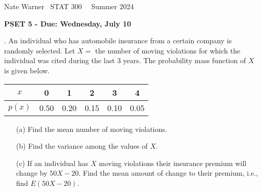 \documentclass{report}
\title{\Huge{}}
\author{\huge{Nathan Warner}}
\date{\huge{}}
\begin{document}
 \pagebreak \bigbreak \noindent
 Nate Warner \ \quad \quad \quad \quad \quad \quad \quad \quad \quad \quad \quad \quad  STAT 300 \quad  \quad \quad \quad \quad \quad \quad \quad \quad \ \ \quad Summer 2024
 \begin{center}
     \textbf{PSET 5 - Due: Wednesday, July 10}
 \end{center}
 \bigbreak \noindent 
 \begin{mdframed}
     . An individual who has automobile insurance from a certain company is randomly selected. Let \( X = \) the number of moving violations for which the individual was cited during the last 3 years. The probability mass function of \( X \) is given below.

     \begin{center}
         \begin{tabular}{|c|c|c|c|c|c|}
             \hline
             \( x \) & 0 & 1 & 2 & 3 & 4 \\
             \hline
             \( p(x) \) & 0.50 & 0.20 & 0.15 & 0.10 & 0.05 \\
             \hline
         \end{tabular}
     \end{center}
     \begin{itemize}
         \item[(a)] Find the mean number of moving violations.
         \item[(b)] Find the variance among the values of \( X \).
         \item[(c)] If an individual has \( X \) moving violations their insurance premium will change by $50X - $20. Find the mean amount of change to their premium, i.e., find \( E(50X - 20) \).
     \end{itemize}
 \end{mdframed}
\end{document}
